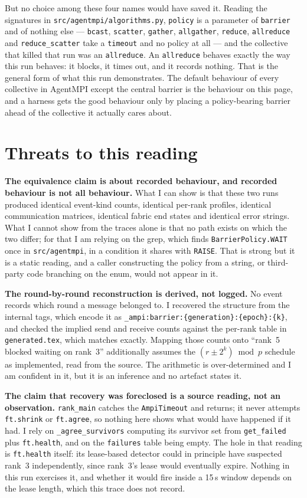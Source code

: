 \documentclass[11pt]{article}
\begin{document}
But no choice among these four names would have saved it. Reading the signatures in
\texttt{src/agentmpi/algorithms.py}, \texttt{policy} is a parameter of \texttt{barrier}
and of nothing else --- \texttt{bcast}, \texttt{scatter}, \texttt{gather},
\texttt{allgather}, \texttt{reduce}, \texttt{allreduce} and \texttt{reduce\_scatter} take
a \texttt{timeout} and no policy at all --- and the collective that killed that run was an
\texttt{allreduce}. An \texttt{allreduce} behaves exactly the way this run behaves: it
blocks, it times out, and it records nothing. That is the general form of what this run
demonstrates. The default behaviour of every collective in AgentMPI except the central
barrier is the behaviour on this page, and a harness gets the good behaviour only by
placing a policy-bearing barrier ahead of the collective it actually cares about.

\section{Threats to this reading}

\textbf{The equivalence claim is about recorded behaviour, and recorded behaviour is not
all behaviour.} What I can show is that these two runs produced identical event-kind
counts, identical per-rank profiles, identical communication matrices, identical fabric
end states and identical error strings. What I cannot show from the traces alone is that
no path exists on which the two differ; for that I am relying on the grep, which finds
\texttt{BarrierPolicy.WAIT} once in \texttt{src/agentmpi}, in a condition it shares with
\texttt{RAISE}. That is strong but it is a static reading, and a caller constructing the
policy from a string, or third-party code branching on the enum, would not appear in it.

\textbf{The round-by-round reconstruction is derived, not logged.} No event records which
round a message belonged to. I recovered the structure from the internal tags, which
encode it as \texttt{\_ampi:barrier:\{generation\}:\{epoch\}:\{k\}}, and checked the
implied send and receive counts against the per-rank table in \texttt{generated.tex},
which matches exactly. Mapping those counts onto ``rank~5 blocked waiting on rank~3''
additionally assumes the $(r \pm 2^k) \bmod p$ schedule as implemented, read from the
source. The arithmetic is over-determined and I am confident in it, but it is an
inference and no artefact states it.

\textbf{The claim that recovery was foreclosed is a source reading, not an observation.}
\texttt{rank\_main} catches the \texttt{AmpiTimeout} and returns; it never attempts
\texttt{ft.shrink} or \texttt{ft.agree}, so nothing here shows what would have happened if
it had. I rely on \texttt{\_agree\_survivors} computing its survivor set from
\texttt{get\_failed} plus \texttt{ft.health}, and on the \texttt{failures} table being
empty. The hole in that reading is \texttt{ft.health} itself: its lease-based detector
could in principle have suspected rank~3 independently, since rank~3's lease would
eventually expire. Nothing in this run exercises it, and whether it would fire inside a
15\,s window depends on the lease length, which this trace does not record.
\end{document}
